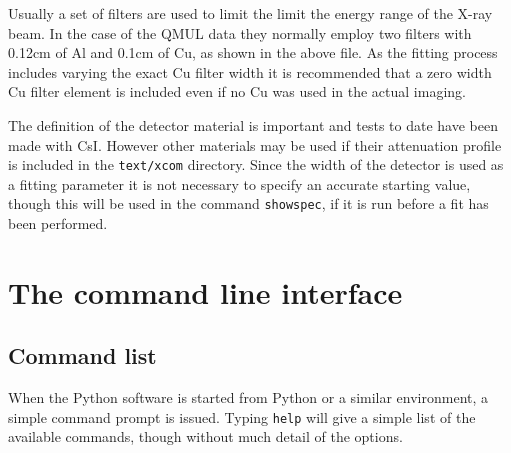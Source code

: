 \documentclass[a4paper,12pt]{article}
\begin{document}
Usually a set of filters are used to limit the limit the energy range of the X-ray beam. In the case of the QMUL data they
normally employ two filters with 0.12cm of Al and 0.1cm of Cu, as shown in the above file.
As the fitting process includes varying the exact Cu filter width it is recommended that a zero width Cu filter element is included
even if no Cu was used in the actual imaging.

The definition of the detector material is important and tests to date have been made with CsI. However other materials may be used
if their attenuation profile is included in the \texttt{text/xcom} directory.
Since the width of the detector is used as a fitting parameter it is not necessary to specify an accurate starting value, though this
will be used in the command \texttt{showspec}, if it is run before a fit has been performed.

\section{The command line interface}

\subsection{Command list}

When the Python software is started from Python or a similar environment, a simple command prompt is issued.
Typing \texttt{help} will give a simple list of the available commands, though without much detail of the options.
\end{document}
